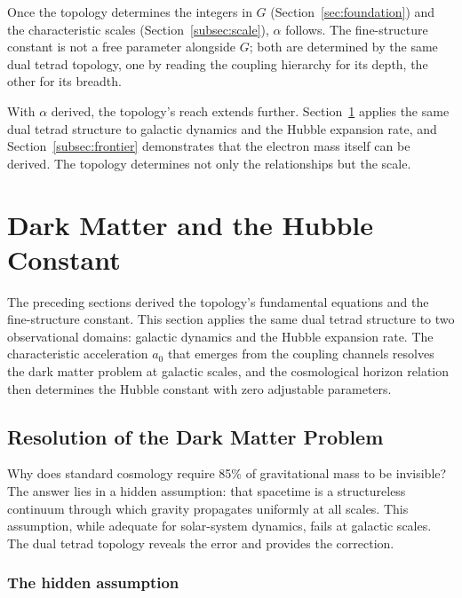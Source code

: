 \documentclass[aps,prd,preprint,superscriptaddress,showpacs,preprintnumbers,amsmath,amssymb,nofootinbib]{revtex4-2}
\begin{document}
Once the topology determines the integers in $G$ (Section~\ref{sec:foundation}) and the characteristic scales (Section~\ref{subsec:scale}), $\alpha$ follows. The fine-structure constant is not a free parameter alongside $G$; both are determined by the same dual tetrad topology, one by reading the coupling hierarchy for its depth, the other for its breadth.

With $\alpha$ derived, the topology's reach extends further. Section~\ref{sec:darkmatter} applies the same dual tetrad structure to galactic dynamics and the Hubble expansion rate, and Section~\ref{subsec:frontier} demonstrates that the electron mass itself can be derived. The topology determines not only the relationships but the scale.

\section{Dark Matter and the Hubble Constant}
\label{sec:darkmatter}

The preceding sections derived the topology's fundamental equations and the fine-structure constant. This section applies the same dual tetrad structure to two observational domains: galactic dynamics and the Hubble expansion rate. The characteristic acceleration $a_0$ that emerges from the coupling channels resolves the dark matter problem at galactic scales, and the cosmological horizon relation then determines the Hubble constant with zero adjustable parameters.

\subsection{Resolution of the Dark Matter Problem}
\label{subsec:darkmatter}

Why does standard cosmology require 85\% of gravitational mass to be invisible? The answer lies in a hidden assumption: that spacetime is a structureless continuum through which gravity propagates uniformly at all scales. This assumption, while adequate for solar-system dynamics, fails at galactic scales. The dual tetrad topology reveals the error and provides the correction.

\subsubsection*{The hidden assumption}
\end{document}
